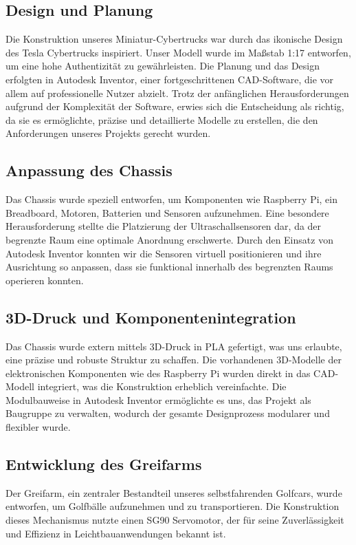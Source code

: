 \subsection{Design und Planung}
Die Konstruktion unseres Miniatur-Cybertrucks war durch das ikonische Design des Tesla Cybertrucks inspiriert. Unser Modell wurde im Maßstab 1:17 entworfen, um eine hohe Authentizität zu gewährleisten. Die Planung und das Design erfolgten in Autodesk Inventor, einer fortgeschrittenen CAD-Software, die vor allem auf professionelle Nutzer abzielt. Trotz der anfänglichen Herausforderungen aufgrund der Komplexität der Software, erwies sich die Entscheidung als richtig, da sie es ermöglichte, präzise und detaillierte Modelle zu erstellen, die den Anforderungen unseres Projekts gerecht wurden.

\subsection{Anpassung des Chassis}
Das Chassis wurde speziell entworfen, um Komponenten wie Raspberry Pi, ein Breadboard, Motoren, Batterien und Sensoren aufzunehmen. Eine besondere Herausforderung stellte die Platzierung der Ultraschallsensoren dar, da der begrenzte Raum eine optimale Anordnung erschwerte. Durch den Einsatz von Autodesk Inventor konnten wir die Sensoren virtuell positionieren und ihre Ausrichtung so anpassen, dass sie funktional innerhalb des begrenzten Raums operieren konnten.

\subsection{3D-Druck und Komponentenintegration}
Das Chassis wurde extern mittels 3D-Druck in PLA gefertigt, was uns erlaubte, eine präzise und robuste Struktur zu schaffen. Die vorhandenen 3D-Modelle der elektronischen Komponenten wie des Raspberry Pi wurden direkt in das CAD-Modell integriert, was die Konstruktion erheblich vereinfachte. Die Modulbauweise in Autodesk Inventor ermöglichte es uns, das Projekt als Baugruppe zu verwalten, wodurch der gesamte Designprozess modularer und flexibler wurde.

\subsection{Entwicklung des Greifarms}
Der Greifarm, ein zentraler Bestandteil unseres selbstfahrenden Golfcars, wurde entworfen, um Golfbälle aufzunehmen und zu transportieren. Die Konstruktion dieses Mechanismus nutzte einen SG90 Servomotor, der für seine Zuverlässigkeit und Effizienz in Leichtbauanwendungen bekannt ist.

